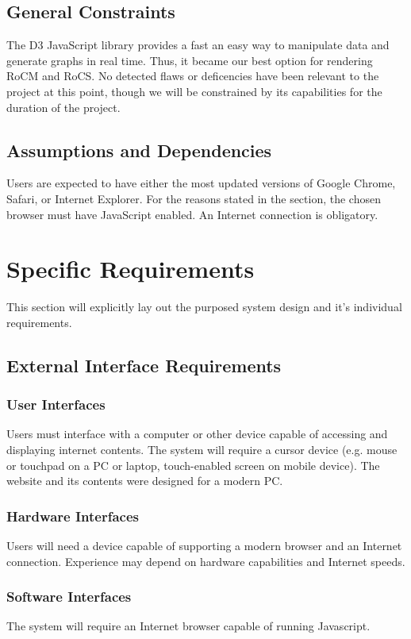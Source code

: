 \documentclass[titlepage]{article}
\begin{document}
\subsection{General Constraints}
\label{General Constraints}
The D3 JavaScript library provides a fast an easy way to manipulate data and generate graphs in real time. Thus, it became our best option for rendering RoCM and RoCS. No detected flaws or deficencies have been relevant to the project at this point, though we will be constrained by its capabilities for the duration of the project.

\subsection{Assumptions and Dependencies}
Users are expected to have either the most updated versions of Google Chrome, Safari, or Internet Explorer. For the reasons stated in the  section, the chosen browser must have JavaScript enabled. An Internet connection is obligatory.

\section{Specific Requirements}
\label{Specific Requirements}
This section will explicitly lay out the purposed system design and it's individual requirements.

\subsection{External Interface Requirements}
\subsubsection{User Interfaces}
Users must interface with a computer or other device capable of accessing and displaying internet contents. The system will require a cursor device (e.g. mouse or touchpad on a PC or laptop, touch-enabled screen on mobile device). The website and its contents were designed for a modern PC.

\subsubsection{Hardware Interfaces}
Users will need a device capable of supporting a modern browser and an Internet connection. Experience may depend on hardware capabilities and Internet speeds.

\subsubsection{Software Interfaces}
The system will require an Internet browser capable of running Javascript.
\end{document}
